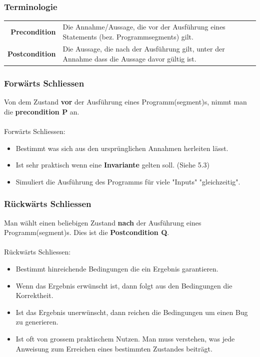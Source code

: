 \documentclass[12pt,a4paper]{article}
\begin{document}
\subsubsection{Terminologie}
\begin{tabularx}{\linewidth}{r X}
\textbf{Precondition} & Die Annahme/Aussage, die vor der Ausführung eines Statements (bez. Programmsegments) gilt.\\
\textbf{Postcondition} & Die Aussage, die nach der Ausführung gilt, unter der Annahme dass die Aussage davor gültig ist.
\end{tabularx}
\subsubsection{Forwärts Schliessen}
Von dem Zustand \textbf{vor} der Ausführung eines Programm(segment)s, nimmt man die \textbf{precondition P} an.\\\\
Forwärts Schliessen:
\begin{itemize}
\item Bestimmt was sich aus den ursprünglichen Annahmen herleiten lässt.
\item Ist sehr praktisch wenn eine \textbf{Invariante} gelten soll. (Siehe 5.3) %
\item Simuliert die Ausführung des Programms für viele "Inputs" "gleichzeitig".
\end{itemize}
\newpage
\subsubsection{Rückwärts Schliessen}
Man wählt einen beliebigen Zustand \textbf{nach} der Ausführung eines Programm(segment)s. Dies ist die \textbf{Postcondition Q}.\\\\
Rückwärts Schliessen:
\begin{itemize}
\item Bestimmt hinreichende Bedingungen die ein Ergebnis garantieren.
\item Wenn das Ergebnis erwünscht ist, dann folgt aus den Bedingungen die Korrektheit.
\item Ist das Ergebnis unerwünscht, dann reichen die Bedingungen um einen Bug zu generieren.
\item Ist oft von grossem praktischem Nutzen. Man muss verstehen, was jede Anweisung zum Erreichen eines bestimmten Zustandes beiträgt.
\end{itemize}
\end{document}
